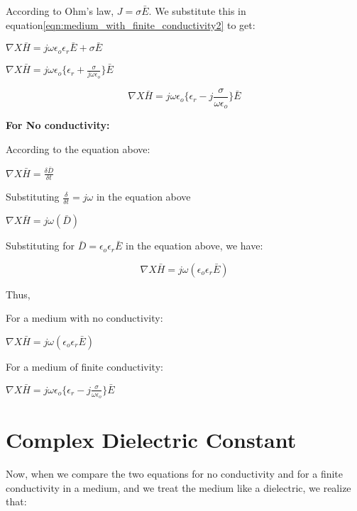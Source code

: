 According to Ohm's law, $J = \sigma\bar{E}$. We substitute this in equation\ref{eqn:medium_with_finite_conductivity2} to get:

\begin{center}
$\nabla X \bar{H} = j\omega\epsilon_{o}\epsilon_{r}\bar{E} + \sigma\bar{E}$ 
\end{center}

\begin{center}
$\nabla X \bar{H} = j\omega\epsilon_{o}\{\epsilon_{r} + \frac{\sigma}{j\omega\epsilon_{o}}\}\bar{E}$ 
\end{center}

\begin{equation}
\nabla X \bar{H} = j\omega\epsilon_{o}\Bigg\{\epsilon_{r} -j \frac{\sigma}{\omega\epsilon_{o}}\Bigg\}\bar{E} 
\end{equation}

\textbf{For No conductivity:}

According to the equation above:

\begin{center}
$\nabla X \bar{H} = \frac{\delta \bar {D}}{\delta t}$
\end{center}

Substituting $\frac{\delta}{\delta t} = j\omega$ in the equation above

\begin{center}
$\nabla X \bar{H} = j \omega(\bar{D})$
\end{center}

Substituting for $\bar{D} = \epsilon_{o}\epsilon_{r}\bar{E}$ in the equation above, we have:

\begin{equation}
\nabla X \bar{H} = j \omega(\epsilon_{o}\epsilon_{r}\bar{E})
\end{equation}



Thus,

For a medium with no conductivity:
\begin{center}
$\nabla X \bar{H} = j \omega(\epsilon_{o}\epsilon_{r}\bar{E})$
\end{center}

For a medium of finite conductivity:
\begin{center}
$\nabla X \bar{H} = j\omega\epsilon_{o}\bigg\{\epsilon_{r} -j \frac{\sigma}{\omega\epsilon_{o}}\bigg\}\bar{E}$ 
\end{center}

\section{Complex Dielectric Constant}
Now, when we compare the two equations for no conductivity and for a finite conductivity in a medium, and we treat the medium like a dielectric, we realize that:

